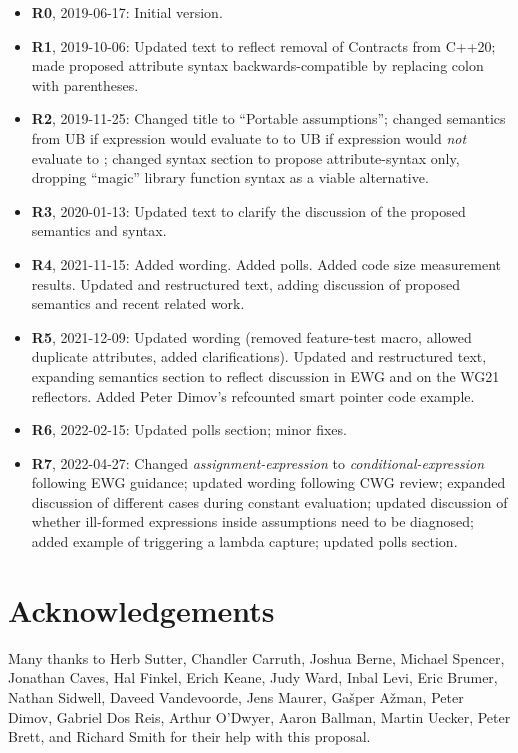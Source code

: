 \begin{itemize}
\item \textbf{R0}, 2019-06-17: Initial version.
\item \textbf{R1}, 2019-10-06: Updated text to reflect removal of Contracts from C++20; made proposed attribute syntax backwards-compatible by replacing colon with parentheses.
\item \textbf{R2}, 2019-11-25: Changed title to ``Portable assumptions''; changed semantics from UB if expression would evaluate to  to UB if expression would \emph{not} evaluate to ; changed syntax section to propose attribute-syntax only, dropping ``magic'' library function syntax as a viable alternative.
\item \textbf {R3}, 2020-01-13: Updated text to clarify the discussion of the proposed semantics and syntax.
\item \textbf{R4}, 2021-11-15:  Added wording. Added polls. Added code size measurement results. Updated and restructured text, adding discussion of proposed semantics and recent related work.
\item \textbf{R5}, 2021-12-09: Updated wording (removed feature-test macro, allowed duplicate attributes, added clarifications). Updated and restructured text, expanding semantics section to reflect discussion in EWG and on the WG21 reflectors. Added Peter Dimov's refcounted smart pointer code example.
\item \textbf{R6}, 2022-02-15: Updated polls section; minor fixes.
\item \textbf{R7}, 2022-04-27: Changed \emph{assignment-expression} to \emph{conditional-expression} following EWG guidance; updated wording following CWG review; expanded discussion of different cases during constant evaluation; updated discussion of whether ill-formed expressions inside assumptions need to be diagnosed; added example of \tcode{[[assume]]} triggering a lambda capture; updated polls section.
\end{itemize}

\section*{Acknowledgements}

Many thanks to Herb Sutter, Chandler Carruth, Joshua Berne, Michael Spencer, Jonathan Caves, Hal Finkel, Erich Keane, Judy Ward, Inbal Levi, Eric Brumer, Nathan Sidwell, Daveed Vandevoorde, Jens Maurer, Ga\v sper A\v zman, Peter Dimov, Gabriel Dos Reis, Arthur O'Dwyer, Aaron Ballman, Martin Uecker, Peter Brett, and Richard Smith for their help with this proposal.

\renewcommand{\bibname}{References}



